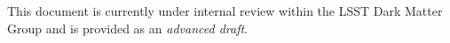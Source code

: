 This document is currently under internal review within the LSST Dark Matter Group and is provided as an \emph{advanced draft}.




